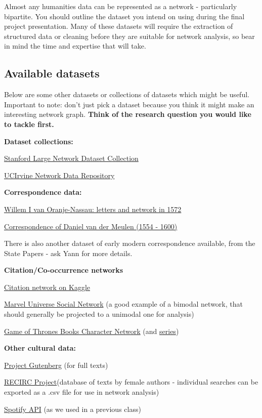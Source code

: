\documentclass[
]{book}
\begin{document}
Almost any humanities data can be represented as a network - particularly bipartite. You should outline the dataset you intend on using during the final project presentation. Many of these datasets will require the extraction of structured data or cleaning before they are suitable for network analysis, so bear in mind the time and expertise that will take.

\hypertarget{available-datasets}{%
\subsection{Available datasets}\label{available-datasets}}

Below are some other datasets or collections of datasets which might be useful. Important to note: don't just pick a dataset because you think it might make an interesting network graph. \textbf{Think of the research question you would like to tackle first.}

\textbf{Dataset collections:}

\href{http://snap.stanford.edu/data/index.html}{Stanford Large Network Dataset Collection}

\href{https://networkdata.ics.uci.edu/}{UCIrvine Network Data Repository}

\textbf{Correspondence data:}

\href{https://dataverse.nl/dataset.xhtml?persistentId=doi:10.34894/ZSIKRI}{Willem I van Oranje-Nassau: letters and network in 1572}

\href{https://github.com/jessesadler/dvdm-correspondence}{Correspondence of Daniel van der Meulen (1554 - 1600)}

There is also another dataset of early modern correspondence available, from the State Papers - ask Yann for more details.

\textbf{Citation/Co-occurrence networks}

\href{https://www.kaggle.com/datasets/mathurinache/citation-network-dataset}{Citation network on Kaggle}

\href{https://www.kaggle.com/datasets/csanhueza/the-marvel-universe-social-network}{Marvel Universe Social Network} (a good example of a bimodal network, that should generally be projected to a unimodal one for analysis)

\href{https://github.com/mathbeveridge/asoiaf}{Game of Thrones Books Character Network} (and \href{https://github.com/mathbeveridge/gameofthrones}{series})

\textbf{Other cultural data:}

\href{https://www.gutenberg.org/}{Project Gutenberg} (for full texts)

\href{https://recirc.universityofgalway.ie/explore}{RECIRC Project}(database of texts by female authors - individual searches can be exported as a .csv file for use in network analysis)

\href{https://developer.spotify.com/documentation/web-api/}{Spotify API} (as we used in a previous class)

  
\end{document}
